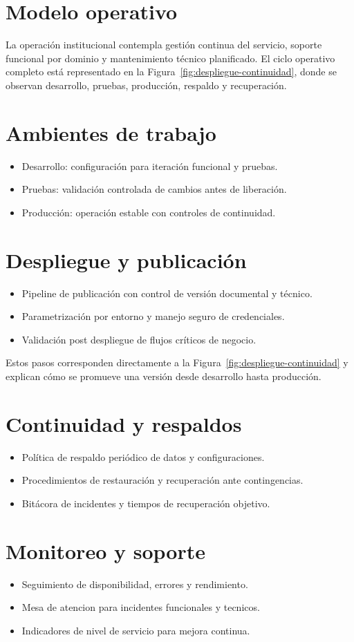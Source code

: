 \section{Modelo operativo}
La operación institucional contempla gestión continua del servicio, soporte funcional por dominio y mantenimiento técnico planificado.
El ciclo operativo completo está representado en la Figura~\ref{fig:despliegue-continuidad}, donde se observan desarrollo, pruebas, producción, respaldo y recuperación.

\section{Ambientes de trabajo}
\begin{itemize}
  \item Desarrollo: configuración para iteración funcional y pruebas.
  \item Pruebas: validación controlada de cambios antes de liberación.
  \item Producción: operación estable con controles de continuidad.
\end{itemize}

\section{Despliegue y publicación}
\begin{itemize}
  \item Pipeline de publicación con control de versión documental y técnico.
  \item Parametrización por entorno y manejo seguro de credenciales.
  \item Validación post despliegue de flujos críticos de negocio.
\end{itemize}
Estos pasos corresponden directamente a la Figura~\ref{fig:despliegue-continuidad} y explican cómo se promueve una versión desde desarrollo hasta producción.

\section{Continuidad y respaldos}
\begin{itemize}
  \item Política de respaldo periódico de datos y configuraciones.
  \item Procedimientos de restauración y recuperación ante contingencias.
  \item Bitácora de incidentes y tiempos de recuperación objetivo.
\end{itemize}

\section{Monitoreo y soporte}
\begin{itemize}
  \item Seguimiento de disponibilidad, errores y rendimiento.
  \item Mesa de atencion para incidentes funcionales y tecnicos.
  \item Indicadores de nivel de servicio para mejora continua.
\end{itemize}

